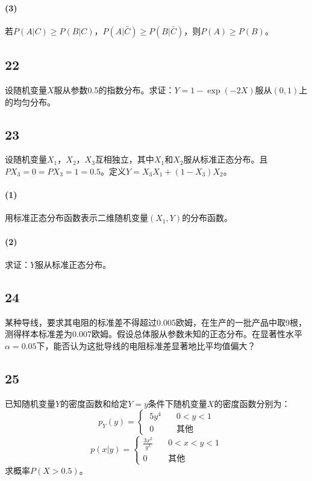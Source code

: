 \documentclass[a4paper,12pt]{article}
\begin{document}
\paragraph{(3)}若$P(A|C)\geq P(B|C)$，$P(A|\bar{C})\geq P(B|\bar{C})$，则$P(A)\geq P(B)$。
\subsection*{22}\noindent 设随机变量$X$服从参数0.5的指数分布。求证：$Y=1-\exp(-2X)$服从$\left(0,1\right)$上的均匀分布。
\subsection*{23}\noindent 设随机变量$X_{1}$，$X_{2}$，$X_{3}$互相独立，其中$X_{1}$和$X_{2}$服从标准正态分布。且$P{X_{3}=0}=P{X_{3}=1}=0.5$。定义$Y=X_{3}X_{1}+\left(1-X_{3}\right)X_{2}$。
\paragraph{(1)}用标准正态分布函数表示二维随机变量$\left(X_{1},Y\right)$的分布函数。
\paragraph{(2)}求证：$Y$服从标准正态分布。
\subsection*{24}\noindent 某种导线，要求其电阻的标准差不得超过0.005欧姆，在生产的一批产品中取9根，测得样本标准差为0.007欧姆。假设总体服从参数未知的正态分布。在显著性水平$\alpha=0.05$下，能否认为这批导线的电阻标准差显著地比平均值偏大？
\subsection*{25}\noindent 已知随机变量$Y$的密度函数和给定$Y=y$条件下随机变量$X$的密度函数分别为：
\begin{equation*}
	p_{Y}(y)=\left\{\
	\begin{aligned}
		5y^4&\quad 0<y<1\\0&\quad \mbox{其他}
	\end{aligned}
\right.
\end{equation*}
\begin{equation*}
	p(x|y)=\left\{
	\begin{aligned}
		\frac{3x^2}{y^3}\quad&0<x<y<1\\0\quad&\mbox{其他}
	\end{aligned}
	\right.
\end{equation*}
求概率$P(X>0.5)$。
\end{document}
